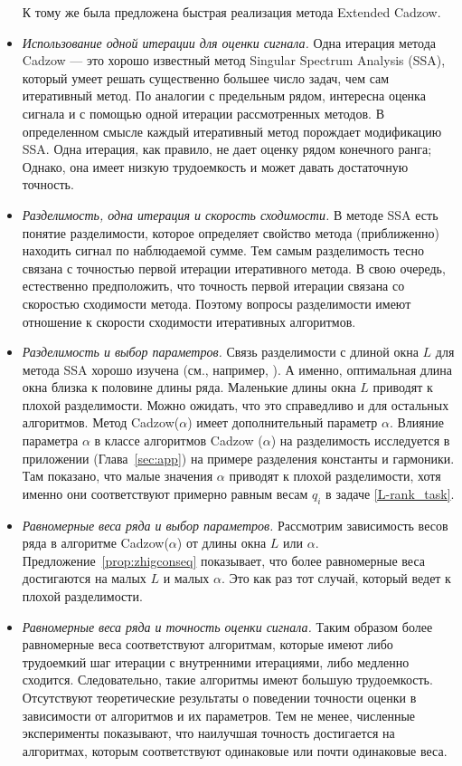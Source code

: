 \documentclass[12pt, specialist, subf,href,colorlinks=true,substylefile = spbu.rtx]{disser}
\theoremstyle{remark}
\theoremstyle{definition}
\begin{document}
\begin{itemize}
	К тому же была предложена быстрая реализация метода Extended Cadzow.
	\item \textit{Использование одной итерации для оценки сигнала.}
	Одна итерация метода Cadzow --- это хорошо известный метод Singular Spectrum Analysis (SSA), который умеет решать существенно большее число задач, чем сам итеративный метод. По аналогии с предельным рядом, интересна оценка сигнала и с помощью одной итерации рассмотренных методов. В определенном смысле каждый итеративный метод порождает модификацию SSA. Одна итерация, как правило, не дает оценку рядом конечного ранга; Однако, она имеет низкую трудоемкость и может давать достаточную точность.
	\item \textit{Разделимость, одна итерация и скорость сходимости.}
	В методе SSA есть понятие разделимости, которое определяет свойство метода (приближенно) находить сигнал по наблюдаемой сумме. Тем самым разделимость
	тесно связана с точностью первой итерации итеративного метода. В свою очередь, естественно предположить, что точность первой итерации связана со скоростью сходимости метода. Поэтому вопросы разделимости имеют отношение к скорости сходимости итеративных алгоритмов.
	\item \textit{Разделимость и выбор параметров.}
	Связь разделимости с длиной окна $L$ для метода SSA хорошо изучена (см., например, \cite{Golyandina2010}). А именно, оптимальная длина окна близка
	к половине длины ряда. Маленькие длины окна $L$ приводят к плохой разделимости. Можно ожидать, что это справедливо и для остальных алгоритмов. Метод Cadzow($\alpha$) имеет дополнительный параметр $\alpha$. Влияние параметра $\alpha$ в классе алгоритмов
	Cadzow ($\alpha$) на разделимость исследуется в приложении (Глава~\ref{sec:app}) на примере разделения константы и гармоники. Там показано, что малые значения
	$\alpha$ приводят к плохой разделимости, хотя именно они соответствуют примерно равным весам $q_i$ в задаче \eqref{L-rank_task}.
	\item \textit{Равномерные веса ряда и выбор параметров.}
	Рассмотрим зависимость весов ряда в алгоритме Cadzow($\alpha$) от длины окна $L$ или $\alpha$. Предложение~\ref{prop:zhigconseq} показывает, что более равномерные веса достигаются на малых $L$ и малых $\alpha$. Это как раз тот случай, который ведет к плохой разделимости.
	\item \textit{Равномерные веса ряда и точность оценки сигнала.}
	Таким образом более равномерные веса соответствуют алгоритмам, которые имеют либо трудоемкий шаг итерации с внутренними итерациями, либо медленно сходится. Следовательно, такие алгоритмы имеют большую трудоемкость. Отсутствуют теоретические результаты о поведении точности оценки в зависимости от алгоритмов и их параметров. Тем не менее, численные эксперименты показывают, что наилучшая точность достигается на алгоритмах, которым соответствуют одинаковые или почти одинаковые веса.
    \end{itemize}
	
\end{document}
